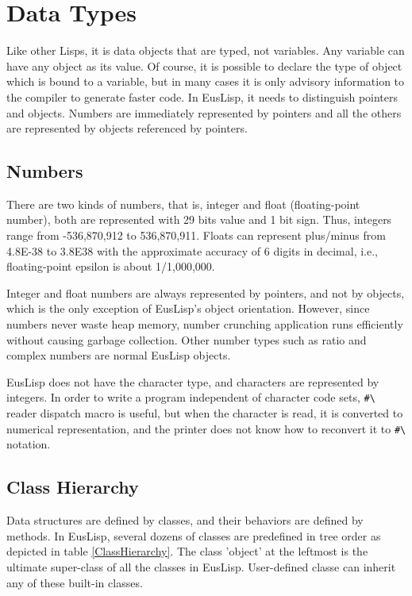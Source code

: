 
\section{Data Types}
Like other Lisps, it is data objects that are typed, not variables.
Any variable can have any object as its value.
Of course, it is possible to
declare the type of object which is bound to a variable, but in many cases
it is only advisory information to the compiler to generate faster code.
In EusLisp, it needs to distinguish pointers and objects.
Numbers are immediately represented by pointers and all the others
are represented by objects referenced by pointers.
 
\subsection{Numbers}

There are two kinds of numbers, that is, 
integer and float (floating-point number), both are represented
with 29 bits value and 1 bit sign.
Thus, integers range from -536,870,912 to 536,870,911.
Floats can represent plus/minus from 4.8E-38 to 3.8E38 with the
approximate accuracy of 6 digits in decimal, i.e.,
floating-point epsilon is about 1/1,000,000.

Integer and float numbers are always represented by pointers, and not by objects,
which is the only exception of EusLisp's object orientation.
However, since numbers never waste heap memory, number crunching application
runs efficiently without causing garbage collection.
Other number types such as ratio and complex numbers are normal EusLisp objects.

EusLisp does not have the character type,
and characters are represented by integers.
In order to write a program independent of character code sets,
\verb+#\+ reader dispatch macro is useful, but when the character is read,
it is converted to numerical representation, and the printer does not
know how to reconvert it to
\verb+#\+ notation.

\subsection{Class Hierarchy}

Data structures are defined by classes, and their behaviors are defined by
methods.
In EusLisp, several dozens of classes are predefined in tree order
as depicted in table \ref{ClassHierarchy}.
The class 'object' at the leftmost is the ultimate super-class of
all the classes in EusLisp.
User-defined classe can inherit any of these built-in classes.


